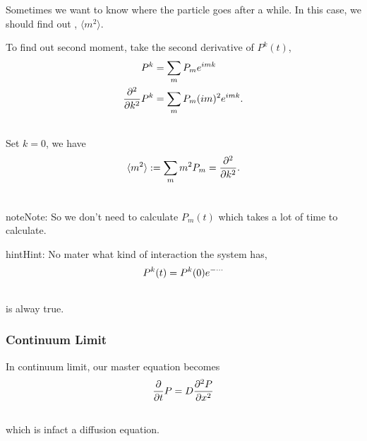 \documentclass[letterpaper,10pt,english]{sphinxmanual}
\begin{document}
Sometimes we want to know where the particle goes after a while. In this case, we should find out , $\langle m^2 \rangle$.

To find out second moment, take the second derivative of $P^k(t)$,
\begin{gather}
\begin{split}P^k &=\sum_m P_m e^{imk} \\
\frac{\partial^2}{\partial k^2} P^k &= \sum_m P_m (i m)^2 e^{imk} .\end{split}\notag\\\begin{split}\end{split}\notag
\end{gather}
Set $k=0$, we have
\begin{gather}
\begin{split}\langle m^2 \rangle := \sum_m m^2 P_m =\frac{\partial^2}{\partial k^2} .\end{split}\notag\\\begin{split}\end{split}\notag
\end{gather}
\begin{notice}{note}{Note:}
So we don't need to calculate $P_m(t)$ which takes a lot of time to calculate.
\end{notice}

\begin{notice}{hint}{Hint:}
No mater what kind of interaction the system has,
\begin{gather}
\begin{split}P^k(t) = P^k(0) e^{-\cdots}\end{split}\notag\\\begin{split}\end{split}\notag
\end{gather}
is alway true.
\end{notice}


\subsubsection{Continuum Limit}
\label{nonequilibrium/week11:continuum-limit}
In continuum limit, our master equation becomes
\begin{gather}
\begin{split}\frac{\partial}{\partial t} P = D \frac{\partial^2 P}{\partial x^2}\end{split}\notag\\\begin{split}\end{split}\notag
\end{gather}
which is infact a diffusion equation.
\end{document}
